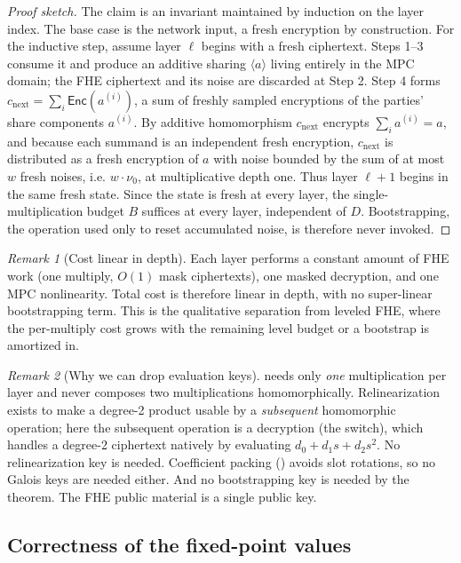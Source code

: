 \documentclass[11pt]{article}
\theoremstyle{plain}
\theoremstyle{definition}
\theoremstyle{remark}
\newtheorem{remark}{Remark}
\newcommand{\Enc}{\mathsf{Enc}}
\begin{document}
\begin{proof}[Proof sketch]
The claim is an invariant maintained by induction on the layer index. The
base case is the network input, a fresh encryption by construction. For the
inductive step, assume layer $\ell$ begins with a fresh ciphertext. Steps
1--3 consume it and produce an additive sharing $\langle a\rangle$ living
entirely in the MPC domain; the FHE ciphertext and its noise are discarded
at Step 2. Step 4 forms
$c_{\mathrm{next}} = \sum_{i} \Enc(a^{(i)})$, a sum of freshly sampled
encryptions of the parties' share components $a^{(i)}$. By additive
homomorphism $c_{\mathrm{next}}$ encrypts $\sum_i a^{(i)} = a$, and because
each summand is an independent fresh encryption, $c_{\mathrm{next}}$ is
distributed as a fresh encryption of $a$ with noise bounded by the sum of at
most $w$ fresh noises, i.e. $w\cdot\nu_0$, at multiplicative depth one. Thus
layer $\ell+1$ begins in the same fresh state. Since the state is fresh at
every layer, the single-multiplication budget $B$ suffices at every layer,
independent of $D$. Bootstrapping, the operation used only to reset
accumulated noise, is therefore never invoked.
\end{proof}

\begin{remark}[Cost linear in depth]
Each layer performs a constant amount of FHE work (one multiply, $O(1)$ mask
ciphertexts), one masked decryption, and one MPC nonlinearity. Total cost is
therefore linear in depth, with no super-linear bootstrapping term. This is
the qualitative separation from leveled FHE, where the per-multiply cost
grows with the remaining level budget or a bootstrap is amortized in.
\end{remark}

\begin{remark}[Why we can drop evaluation keys]
 needs only \emph{one} multiplication per layer and never
composes two multiplications homomorphically. Relinearization exists to make
a degree-2 product usable by a \emph{subsequent} homomorphic operation; here
the subsequent operation is a decryption (the switch), which handles a
degree-2 ciphertext natively by evaluating $d_0+d_1 s + d_2 s^2$. No
relinearization key is needed. Coefficient packing ()
avoids slot rotations, so no Galois keys are needed either. And no
bootstrapping key is needed by the theorem. The FHE public material is a
single public key.
\end{remark}

\subsection{Correctness of the fixed-point values}
\end{document}
